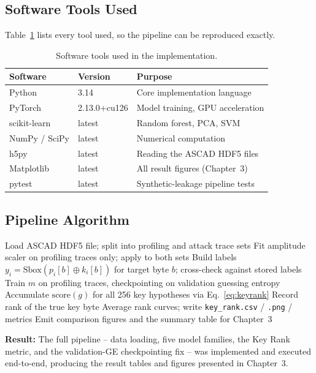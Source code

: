 \subsection{Software Tools Used}

Table~\ref{tab:tools} lists every tool used, so the pipeline can be reproduced
exactly.

\begin{table}[h]
\centering
\caption{Software tools used in the implementation.}
\label{tab:tools}
\begin{tabular}{@{}lll@{}}
\toprule
Software & Version & Purpose \\
\midrule
Python & 3.14 & Core implementation language \\
PyTorch & 2.13.0+cu126 & Model training, GPU acceleration \\
scikit-learn & latest & Random forest, PCA, SVM \\
NumPy / SciPy & latest & Numerical computation \\
h5py & latest & Reading the ASCAD HDF5 files \\
Matplotlib & latest & All result figures (Chapter~3) \\
pytest & latest & Synthetic-leakage pipeline tests \\
\bottomrule
\end{tabular}
\end{table}

\subsection{Pipeline Algorithm}

\begin{algorithm}[h]
\caption{ASCAD Key-Recovery Benchmark Pipeline}
\begin{algorithmic}
\State Load ASCAD HDF5 file; split into profiling and attack trace sets
\State Fit amplitude scaler on profiling traces only; apply to both sets
\State Build labels $y_i = \mathrm{Sbox}(p_i[b] \oplus k_i[b])$ for target byte $b$; cross-check against stored labels
    \State Train $m$ on profiling traces, checkpointing on validation guessing entropy
        \State Accumulate $\mathrm{score}(g)$ for all 256 key hypotheses via Eq.~\eqref{eq:keyrank}
        \State Record rank of the true key byte
    \EndFor
    \State Average rank curves; write \texttt{key\_rank.csv} / \texttt{.png} / metrics
\EndFor
\State Emit comparison figures and the summary table for Chapter~3
\end{algorithmic}
\end{algorithm}

\textbf{Result:} The full pipeline -- data loading, five model families, the Key Rank
metric, and the validation-GE checkpointing fix -- was implemented and executed
end-to-end, producing the result tables and figures presented in Chapter~3.
